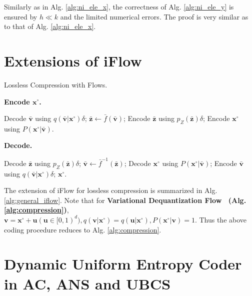\documentclass{article}
\newcommand{\qv}[1]{\bar{\mathbf{#1}}}
\begin{document}
Similarly as in Alg. \ref{alg:ni_ele_x}, the correctness of Alg. \ref{alg:ni_ele_y} is ensured by $h \ll k$ and the limited numerical errors. The proof is very similar as to that of Alg. \ref{alg:ni_ele_x}.

\section{Extensions of iFlow}

\begin{algorithm}[ht]
\small
\caption{Lossless Compression with Flows.}
\begin{multicols}{2} 
\textbf{Encode $\mathbf{x}^{\circ}$.} 

\begin{algorithmic}[1]
\STATE Decode $\qv{v}$ using $q(\qv{v} | \mathbf{x}^\circ) \delta$;
\STATE $\qv{z} \gets \bar{f} (\qv{v})$;
\STATE Encode $\qv{z}$ using $p_Z (\qv{z}) \delta$;
\STATE Encode $\mathbf{x}^\circ$ using $P (\mathbf{x}^\circ | \qv{v})$.
\end{algorithmic}

\textbf{Decode.} 

\begin{algorithmic}[1]
\STATE Decode $\qv{z}$ using $p_Z (\qv{z}) \delta$;
\STATE $\qv{v} \gets \bar{f}^{-1} (\qv{z})$;
\STATE Decode $\mathbf{x}^\circ$ using $P (\mathbf{x}^\circ | \qv{v})$;
\STATE Encode $\qv{v}$ using $q(\qv{v} | \mathbf{x}^\circ) \delta$;
\RETURN $\mathbf{x}^\circ$.
\end{algorithmic}
\end{multicols}
\vspace{-8pt}
\label{alg:general_iflow}
\end{algorithm}

The extension of iFlow for lossless compression is summarized in Alg. \ref{alg:general_iflow}. Note that for \textbf{Variational Dequantization Flow~\cite{hoogeboom2020learning,ho2019compression} (Alg. \ref{alg:compression})}, $\mathbf{v} = \mathbf{x}^\circ + \mathbf{u} (\mathbf{u} \in [0,1)^d), q(\mathbf{v} | \mathbf{x}^\circ) = q(\mathbf{u} | \mathbf{x}^\circ), P(\mathbf{x}^\circ | \mathbf{v}) = 1$. Thus the above coding procedure reduces to Alg. \ref{alg:compression}.

\section{Dynamic Uniform Entropy Coder in AC, ANS and UBCS}
\end{document}
